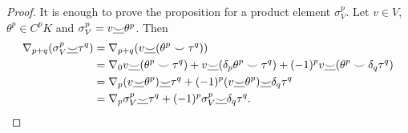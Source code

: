 \begin{proof}
  It is enough to prove the proposition for a product element $\sigma_V^p$.
  Let $v \in V$, $\theta^p \in C^p K$ and $\sigma_V^p = v \underline{\smile} \theta^p$.
  Then
  \begin{equation}
    \begin{split}
      \nabla_{p + q}(\sigma_V^p \underline{\smile} \tau^q)
      & = \nabla_{p + q}(v \underline{\smile} (\theta^p \smile \tau^q)) \\
      & = \nabla_0 v \underline{\smile} (\theta^p \smile \tau^q)
          + v \underline{\smile} (\delta_p \theta^p \smile \tau^q)
          + (-1)^p v \underline{\smile} (\theta^p \smile \delta_q \tau^q) \\
      & = \nabla_p(v \underline{\smile} \theta^p) \underline{\smile} \tau^q
          + (-1)^p (v \underline{\smile} \theta^p) \underline{\smile} \delta_q \tau^q \\
      & = \nabla_p \sigma_V^p \underline{\smile} \tau^q
          + (-1)^p \sigma_V^p \underline{\smile} \delta_q \tau^q.
    \end{split}
  \end{equation}
\end{proof}
